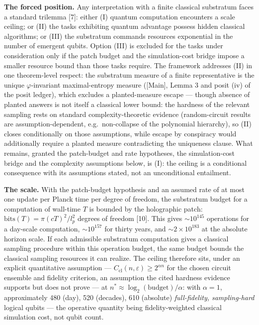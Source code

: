 \documentclass[
]{article}
\begin{document}
\textbf{The forced position.} Any interpretation with a finite classical
substratum faces a standard trilemma {[}7{]}: either (I) quantum
computation encounters a scale ceiling; or (II) the tasks exhibiting
quantum advantage possess hidden classical algorithms; or (III) the
substratum commands resources exponential in the number of emergent
qubits. Option (III) is excluded for the tasks under consideration only
if the patch budget and the simulation-cost bridge impose a smaller
resource bound than those tasks require. The framework addresses (II) in
one theorem-level respect: the substratum measure of a finite
representative is the unique \(\varphi\)-invariant maximal-entropy
measure ({[}Main{]}, Lemma 3 and posit (iv) of the posit ledger), which
excludes a planted-measure escape --- though absence of planted answers
is not itself a classical lower bound: the hardness of the relevant
sampling rests on standard complexity-theoretic evidence (random-circuit
results are assumption-dependent, e.g.~non-collapse of the polynomial
hierarchy), so (II) closes conditionally on those assumptions, while
escape by conspiracy would additionally require a planted measure
contradicting the uniqueness clause. What remains, granted the
patch-budget and rate hypotheses, the simulation-cost bridge and the
complexity assumptions below, is (I): the ceiling is a conditional
consequence with its assumptions stated, not an unconditional
entailment.

\textbf{The scale.} With the patch-budget hypothesis and an assumed rate
of at most one update per Planck time per degree of freedom, the
substratum budget for a computation of wall-time \(T\) is bounded by the
holographic patch: \(\mathrm{bits}(T) = \pi (cT)^2/l_p^2\) degrees of
freedom {[}10{]}. This gives \(\sim 10^{145}\) operations for a
day-scale computation, \(\sim 10^{157}\) for thirty years, and
\(\sim 2 \times 10^{183}\) at the absolute horizon scale. If each
admissible substratum computation gives a classical sampling procedure
within this operation budget, the same budget bounds the classical
sampling resources it can realize. The ceiling therefore sits, under an
explicit quantitative assumption ---
\(C_{\mathrm{cl}}(n, \varepsilon) \geq 2^{\alpha n}\) for the chosen
circuit ensemble and fidelity criterion, an assumption the cited
hardness evidence supports but does not prove --- at
\(n^* \approx \log_2(\mathrm{budget})/\alpha\): with \(\alpha = 1\),
approximately 480 (day), 520 (decades), 610 (absolute)
\emph{full-fidelity, sampling-hard} logical qubits --- the operative
quantity being fidelity-weighted classical simulation cost, not qubit
count.
\end{document}
